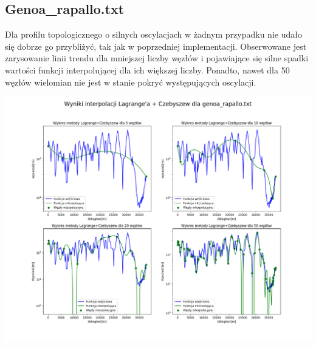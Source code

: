\documentclass[a4paper,12pt]{article}
\begin{document}
   	\subsection{Genoa\_rapallo.txt}
	Dla profilu topologicznego o silnych oscylacjach w żadnym przypadku nie udało się dobrze go przybliżyć, tak jak w poprzedniej implementacji. Obserwowane jest zarysowanie linii trendu dla mniejszej liczby węzłów i pojawiające się silne spadki wartości funkcji interpolującej dla ich większej liczby. Ponadto, nawet dla 50 węzłów wielomian nie jest w stanie pokryć występujących oscylacji.
	\begin{center}
        \includegraphics[scale=0.4]{../charts/chebyshev_genoa_rapallo.png}
    \end{center}
    
    \newpage
\end{document}
